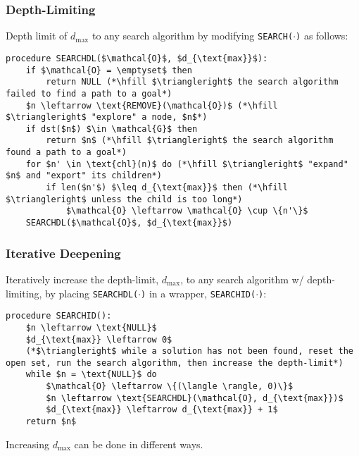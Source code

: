 \subsubsection{Depth-Limiting}
\begin{definition}
    Depth limit of $d_{\text{max}}$ to any search algorithm by modifying \texttt{SEARCH($\cdot$)} as follows:
\begin{lstlisting}
procedure SEARCHDL($\mathcal{O}$, $d_{\text{max}}$):
    if $\mathcal{O} = \emptyset$ then
        return NULL (*\hfill $\triangleright$ the search algorithm failed to find a path to a goal*)
    $n \leftarrow \text{REMOVE}(\mathcal{O})$ (*\hfill $\triangleright$ "explore" a node, $n$*)
    if dst($n$) $\in \mathcal{G}$ then
        return $n$ (*\hfill $\triangleright$ the search algorithm found a path to a goal*)
    for $n' \in \text{chl}(n)$ do (*\hfill $\triangleright$ "expand" $n$ and "export" its children*)
        if len($n'$) $\leq d_{\text{max}}$ then (*\hfill $\triangleright$ unless the child is too long*)
            $\mathcal{O} \leftarrow \mathcal{O} \cup \{n'\}$
    SEARCHDL($\mathcal{O}$, $d_{\text{max}}$)
\end{lstlisting}

\end{definition}

\subsubsection{Iterative Deepening}
\begin{definition}
    Iteratively increase the depth-limit, $d_{\max}$, to any search algorithm w/ depth-limiting, by placing \texttt{SEARCHDL($\cdot$)} in a wrapper, \texttt{SEARCHID($\cdot$)}:
\begin{lstlisting}
procedure SEARCHID():
    $n \leftarrow \text{NULL}$
    $d_{\text{max}} \leftarrow 0$
    (*$\triangleright$ while a solution has not been found, reset the open set, run the search algorithm, then increase the depth-limit*)
    while $n = \text{NULL}$ do
        $\mathcal{O} \leftarrow \{(\langle \rangle, 0)\}$
        $n \leftarrow \text{SEARCHDL}(\mathcal{O}, d_{\text{max}})$
        $d_{\text{max}} \leftarrow d_{\text{max}} + 1$
    return $n$
\end{lstlisting}
    
\end{definition}

\begin{warning}
    Increasing $d_{\text{max}}$ can be done in different ways.
\end{warning}

